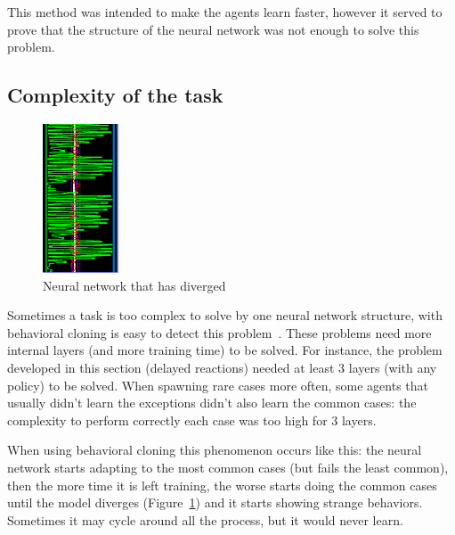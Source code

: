 This method was intended to make the agents learn faster, however it served to prove that the structure of the neural network was not enough to solve this problem.

\subsection{Complexity of the task} 
\label{sec:complex}

\begin{figure}
    \centering
    \includegraphics[width=0.2\textwidth]{img/complexity.png}
		\caption{Neural network that has diverged}
		\label{fig:complexity}
\end{figure}

Sometimes a task is too complex to solve by one neural network structure, with behavioral cloning is easy to detect this problem~\cite{xor}. These problems need more internal layers (and more training time) to be solved. For instance, the problem developed in this section (delayed reactions) needed at least 3 layers (with any policy) to be solved. When spawning rare cases more often, some agents that usually didn't learn the exceptions didn't also learn the common cases: the complexity to perform correctly each case was too high for 3 layers.


When using behavioral cloning this phenomenon occurs like this: the neural network starts adapting to the most common cases (but fails the least common), then the more time it is left training, the worse starts doing the common cases until the model diverges (Figure~\ref{fig:complexity}) and it starts showing strange behaviors. Sometimes it may cycle around all the process, but it would never learn.

